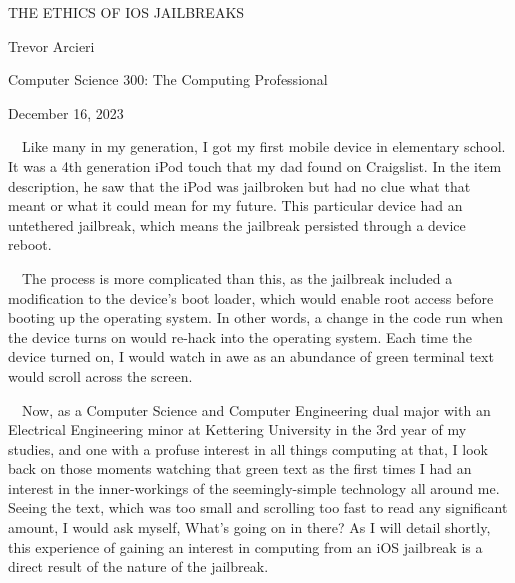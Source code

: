 \documentclass{article}
\date{2023-12-19}
\begin{document}
\clearpage

\bigskip


\bigskip


\bigskip


\bigskip


\bigskip


\bigskip


\bigskip

THE ETHICS OF IOS JAILBREAKS


\bigskip


\bigskip


\bigskip


\bigskip


\bigskip


\bigskip


\bigskip

Trevor Arcieri

Computer Science 300: The Computing Professional

December 16, 2023
\clearpage

\clearpage

\ \ Like many in my generation, I got my first mobile device in elementary school. It was a 4th generation iPod touch
that my dad found on Craigslist. In the item description, he saw that the iPod was
{\textquotedbl}jailbroken{\textquotedbl} but had no clue what that meant or what it could mean for my future. This
particular device had an untethered jailbreak, which means the jailbreak persisted through a device reboot.

\ \ The process is more complicated than this, as the jailbreak included a modification to the device's boot loader,
which would enable root access before booting up the operating system. In other words, a change in the code run when
the device turns on would re-hack into the operating system. Each time the device turned on, I would watch in awe as an
abundance of green terminal text would scroll across the screen.

\ \ Now, as a Computer Science and Computer Engineering dual major with an Electrical Engineering minor at Kettering
University in the 3rd year of my studies, and one with a profuse interest in all things computing at that, I look back
on those moments watching that green text as the first times I had an interest in the inner-workings of the
seemingly-simple technology all around me. Seeing the text, which was too small and scrolling too fast to read any
significant amount, I would ask myself, {\textquotedbl}What's going on in there?{\textquotedbl} As I will detail
shortly, this experience of gaining an interest in computing from an iOS jailbreak is a direct result of the nature of
the jailbreak.
\end{document}
